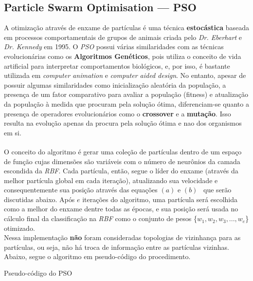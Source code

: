 \documentclass[10pt,twocolumn,letterpaper]{article}
\begin{document}
\subsection{Particle Swarm Optimisation --- PSO}
A otimização através de enxame de partículas é uma técnica \textbf{estocástica} baseada em processos comportamentais de grupos de animais criada pelo \textit{Dr. Eberhart} e  \textit{Dr. Kennedy} em 1995. O \textit{PSO} possui várias similaridades com as técnicas evolucionárias como os \textbf{Algoritmos Genéticos}, pois utiliza o conceito de vida artificial para interpretar comportamentos biológicos, e, por isso, é bastante utilizada em \textit{computer animation} e \textit{computer aided design}. No entanto, apesar de possuir algumas similaridades como inicialização aleatória da população, a presença de um fator comparativo para avaliar a população (fitness) e atualização da população à medida que procuram pela solução ótima, diferenciam-se quanto a presença de operadores evolucionários como o \textbf{crossover} e a \textbf{mutação}. Isso resulta na evolução apenas da procura pela solução ótima e nao dos organismos em si.~\cite{xiao}\\\\O conceito do algoritmo é gerar uma coleção de partículas dentro de um espaço de função cujas dimensões são variáveis com o número de neurônios da camada escondida da \textit{RBF}. Cada partícula, então, segue o líder do enxame (através da melhor partícula global em cada iteração), atualizando sua velocidade e consequentemente sua posição através das equações $(a)$ e $(b)$~\cite{xiao} que serão discutidas abaixo. Após $e$ iterações do algoritmo, uma partícula será escolhida como a melhor do enxame dentre todas as épocas, e sua posição será usada no cálculo final da classificação na \textit{RBF} como o conjunto de pesos \{$w_1, w_2, w_3, ..., w_e$\} otimizado.\\Nessa implementação \textbf{não} foram consideradas topologias de vizinhança para as partículas, ou seja, não há troca de informação entre as partículas vizinhas.~\cite{artigo}\\Abaixo, segue o algoritmo em pseudo-código do procedimento.
\newpage
\begin{algorithm}[h!]
\caption{Pseudo-código do PSO}
\end{algorithm}
\end{document}
